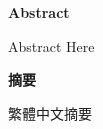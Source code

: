 \begin{center}\label{abstract}
    \huge\bf Abstract
\end{center}

Abstract Here

\pagebreak

\begin{center}
    \huge\bf 摘要
\end{center}



繁體中文摘要

